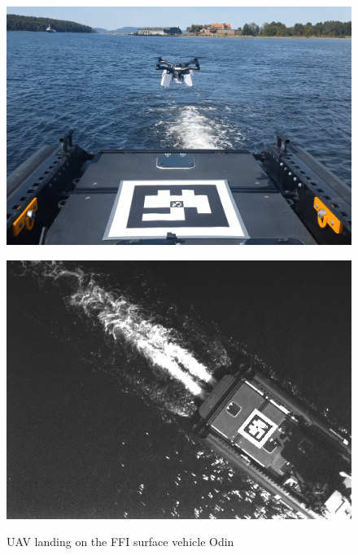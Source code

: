 \begin{figure}[ht]
\begin{minipage}{.52\textwidth}
    \label{fig:olavFrom12m}
  \end{minipage}
\end{figure}
\begin{figure}[ht]
\centering
  \begin{minipage}{.51\textwidth}
    \centering
    \includegraphics[width=\linewidth]{img/landingOnOdin.png}
    \caption{UAV landing on the FFI surface vehicle Odin}
    \label{fig:odinAndTag} 
  \end{minipage}%
  \hfill
  \begin{minipage}{.47\textwidth}
    \centering
    \includegraphics[width=\linewidth]{img/aruco_track_odin_15m.png}
    \label{fig:odinFrom15m}
  \end{minipage}
\end{figure}

